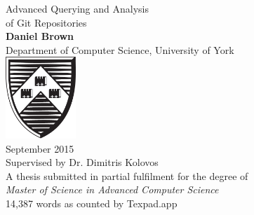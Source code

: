\documentclass[11pt]{book}
\begin{document}
\begin{titlepage}
	\begin{center}
		{\huge Advanced Querying and Analysis\\ of Git Repositories\\}
		\vspace{1.5cm}
		{\Large \textbf{Daniel Brown} \\}
		{\Large Department of Computer Science, University of York \\}
		\vspace{1.5cm}
		\includegraphics[width=100px]{images/university-of-york-shield} \\
		\vspace{1.5cm}
		{\Large September 2015 \\}
		\vspace{1.5cm}
		\Large Supervised by Dr. Dimitris Kolovos \\
		\vspace{1.5cm}
		\Large A thesis submitted in partial fulfilment for the degree of \\ \textit{Master of Science in Advanced Computer Science}\\
		\vspace{5cm}
		\small 14,387 words as counted by Texpad.app
	\end{center}
	\restoregeometry
\end{titlepage}
\end{document}
